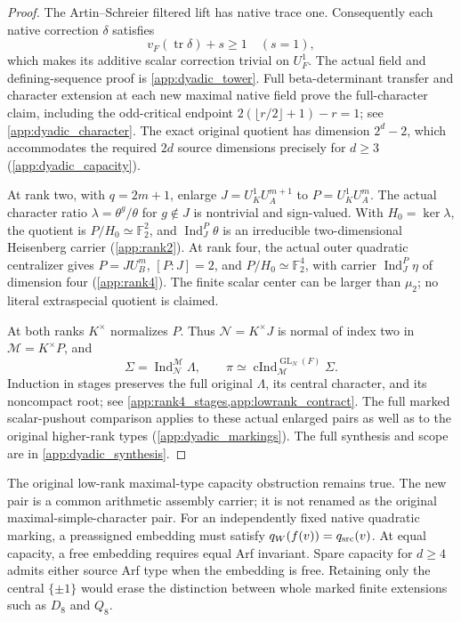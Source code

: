 \documentclass[11pt]{amsart}
\theoremstyle{definition}
\theoremstyle{remark}
\newcommand{\FF}{\mathbb F}
\newcommand{\GL}{\operatorname{GL}}
\newcommand{\Ind}{\operatorname{Ind}}
\newcommand{\cInd}{\operatorname{cInd}}
\begin{document}
\begin{proof}
The Artin--Schreier filtered lift has native trace one. Consequently
each native correction \(\delta\) satisfies
\[
v_F(\operatorname{tr}\delta)+s\ge1 \quad (s=1),
\]
which makes its additive scalar correction trivial on \(U_F^1\).
The actual field and defining-sequence proof is
\cref{app:dyadic_tower}. Full beta-determinant transfer and character
extension at each new maximal native field prove the full-character
claim, including the odd-critical endpoint
\(2(\lfloor r/2\rfloor+1)-r=1\); see \cref{app:dyadic_character}.
The exact original quotient has dimension \(2^d-2\), which accommodates
the required \(2d\) source dimensions precisely for \(d\ge3\)
(\cref{app:dyadic_capacity}).

At rank two, with \(q=2m+1\), enlarge
\(J=U_K^1U_A^{m+1}\) to \(P=U_K^1U_A^m\). The actual character
ratio \(\lambda=\theta^g/\theta\) for \(g\notin J\) is nontrivial
and sign-valued. With \(H_0=\ker\lambda\), the quotient is
\(P/H_0\simeq\FF_2^2\), and \(\Ind_J^P\theta\) is an
irreducible two-dimensional Heisenberg carrier
(\cref{app:rank2}). At rank four, the actual outer quadratic
centralizer gives \(P=J U_B^m\), \([P:J]=2\), and
\(P/H_0\simeq\FF_2^4\), with carrier \(\Ind_J^P\eta\) of
dimension four (\cref{app:rank4}). The finite scalar center can be
larger than \(\mu_2\); no literal extraspecial quotient is claimed.

At both ranks \(K^\times\) normalizes \(P\). Thus
\(\mathcal N=K^\times J\) is normal of index two in
\(\mathcal M=K^\times P\), and
\[
\Sigma=\Ind_{\mathcal N}^{\mathcal M}\Lambda,
\qquad
\pi\simeq\cInd_{\mathcal M}^{\GL_N(F)}\Sigma.
\]
Induction in stages preserves the full original \(\Lambda\), its
central character, and its noncompact root; see
\cref{app:rank4_stages,app:lowrank_contract}. The full marked
scalar-pushout comparison applies to these actual enlarged pairs as
well as to the original higher-rank types (\cref{app:dyadic_markings}).
The full synthesis and scope are in \cref{app:dyadic_synthesis}.
\end{proof}

The original low-rank maximal-type capacity obstruction remains true.
The new pair is a common arithmetic assembly carrier; it is not renamed
as the original maximal-simple-character pair. For an independently
fixed native quadratic marking, a preassigned embedding must satisfy
\(q_W(f(v))=q_{\rm src}(v)\). At equal capacity, a free embedding
requires equal Arf invariant. Spare capacity for \(d\ge4\) admits
either source Arf type when the embedding is free. Retaining only the
central \(\{\pm1\}\) would erase the distinction between whole marked
finite extensions such as \(D_8\) and \(Q_8\).
\end{document}
